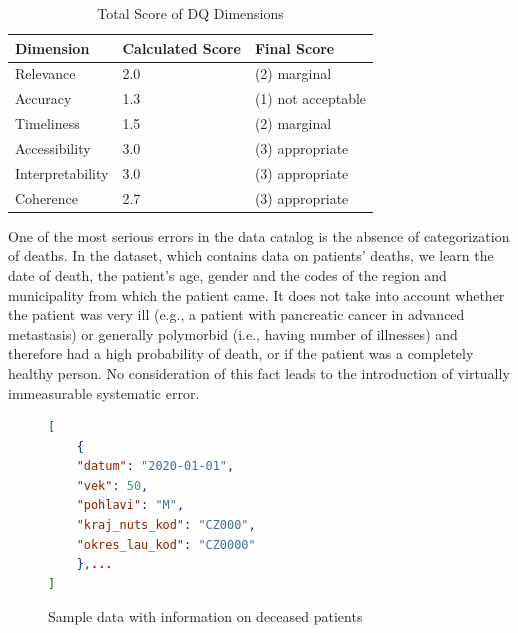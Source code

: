 \begin{table}[htbp]
    \centering

    \begin{tabular}{lll}
        \toprule
        Dimension           & Calculated Score  & Final Score           \\ \midrule
        Relevance           & 2.0               & (2) marginal          \\
        Accuracy            & 1.3               & (1) not acceptable    \\
        Timeliness          & 1.5               & (2) marginal          \\
        Accessibility       & 3.0               & (3) appropriate       \\
        Interpretability    & 3.0               & (3) appropriate       \\
        Coherence           & 2.7               & (3) appropriate       \\
            
        \bottomrule
    \end{tabular}

    \caption{Total Score of DQ Dimensions}
    \label{table:dimensions-score}
\end{table}
\FloatBarrier

One of the most serious errors in the data catalog is the absence of categorization of deaths.
In the dataset, which contains data on patients' deaths, we learn the date of death, the patient's age, gender and the codes of the region and municipality from which the patient came.
It does not take into account whether the patient was very ill (e.g., a patient with pancreatic cancer in advanced metastasis) or generally polymorbid (i.e., having number of illnesses) and therefore had a high probability of death, or if the patient was a completely healthy person.
No consideration of this fact leads to the introduction of virtually immeasurable systematic error.

\begin{figure}[htb]
    \centering

    \begin{lstlisting}[language=json,firstnumber=1]
[
    {
    "datum": "2020-01-01",
    "vek": 50,
    "pohlavi": "M",
    "kraj_nuts_kod": "CZ000",
    "okres_lau_kod": "CZ0000"
    },...
]
    \end{lstlisting}

    \caption{Sample data with information on deceased patients}
    \label{ls:sample-data-deceased}
\end{figure}
\FloatBarrier

